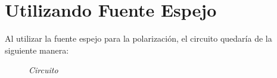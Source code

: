 \documentclass[a4paper,12pt]{article}
\begin{document}
\section{Utilizando Fuente Espejo}
Al utilizar la fuente espejo para la polarización, el circuito quedaría de la siguiente manera:
\begin{figure}[H]
    \setlength{\abovecaptionskip}{0pt}
    \centering
    \captionsetup{labelformat=empty}
    \caption{\small{\textit{ Circuito }}}
\end{figure}
\newpage
\end{document}
